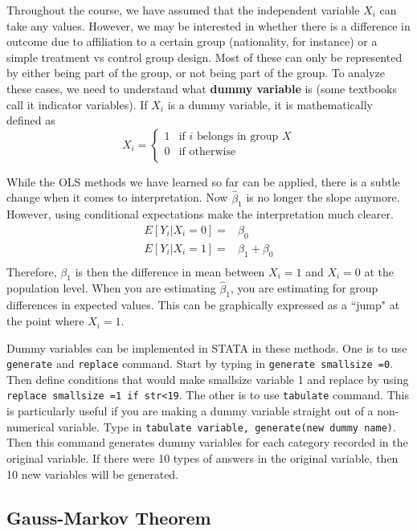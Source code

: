 \documentclass[12pt]{article}
\theoremstyle{definition}
\theoremstyle{property}
\theoremstyle{assumption}
\theoremstyle{example}
\theoremstyle{comment}
\begin{document}
Throughout the course, we have assumed that the independent variable $X_i$ can take any values. However, we may be interested in whether there is a difference in outcome due to affiliation to a certain group (nationality, for instance) or a simple treatment vs control group design. Most of these can only be represented by either being part of the group, or not being part of the group. To analyze these cases, we need to understand what \textbf{dummy variable} is (some textbooks call it indicator variables). If $X_i$ is a dummy variable, it is mathematically defined as
\[
X_i = \begin{cases} 1 & \text{if $i$ belongs in group $X$} \\  0 & \text{if otherwise} \\ \end{cases}
\]
\par\medskip
While the OLS methods we have learned so far can be applied, there is a subtle change when it comes to interpretation. Now $\hat{\beta}_1$ is no longer the slope anymore. However, using conditional expectations make the interpretation much clearer.
\[
\begin{aligned}
E[Y_i |X_i=0]=& \beta_0\\
E[Y_i |X_i=1]=& \beta_1+\beta_0\\
\end{aligned}
\]
Therefore, $\beta_1$ is then the difference in mean between $X_i=1$ and $X_i=0$ at the population level. When you are estimating $\hat{\beta}_1$, you are estimating for group differences in expected values. This can be graphically expressed as a ``jump" at the point where $X_i=1$. \par\medskip
Dummy variables can be implemented in STATA in these methods. One is to use \texttt{generate} and \texttt{replace} command. Start by typing in \texttt{generate smallsize =0}. Then define conditions that would make smallsize variable 1 and replace by using \texttt{replace smallsize =1 if str<19}. The other is to use \texttt{tabulate} command. This is particularly useful if you are making a dummy variable straight out of a non-numerical variable. Type in \texttt{tabulate variable, generate(new dummy name)}. Then this command generates dummy variables for each category recorded in the original variable. If there were 10 types of answers in the original variable, then 10 new variables will be generated. \par\medskip 


\subsection{Gauss-Markov Theorem}
\end{document}
